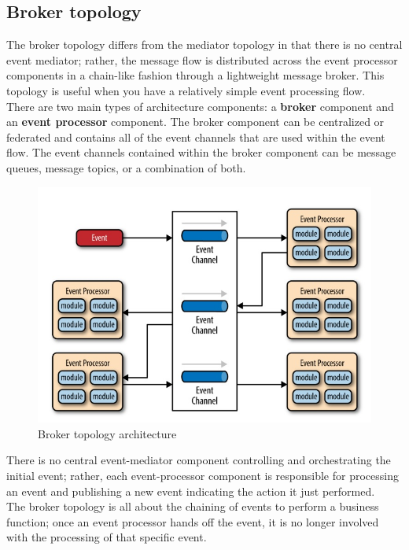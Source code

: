 \subsection{Broker topology}
The broker topology differs from the mediator topology in that there is no central event mediator; rather, the message flow is distributed across the event processor components in a chain-like fashion through a lightweight message broker. This topology is useful when you have a relatively simple event processing flow. \\
There are two main types of architecture components: a \textbf{broker} component and an \textbf{event processor} component. The broker component can be centralized or federated and contains all of the event channels that are used within the event flow. The event channels contained within the broker component can be message queues, message topics, or a combination of both.

\begin{figure} [H]
	\centering
	\includegraphics[scale=1]{Img/broker-topology}
	\caption{Broker topology architecture}\label{}
\end{figure}

There is no central event-mediator component controlling and orchestrating the initial event; rather, each event-processor component is responsible for processing an event and publishing a new event indicating the action it just performed. \\
The broker topology is all about the chaining of events to perform a business function; once an event processor hands off the event, it is no longer involved with the processing of that specific event.

